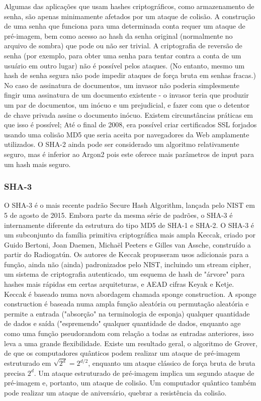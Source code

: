 \documentclass[conference]{IEEEtran}
\begin{document}
Algumas das aplicações que usam hashes criptográficos, como armazenamento de senha, são apenas 
minimamente afetados por um ataque de colisão. A construção de uma senha que funciona para uma 
determinada conta requer um ataque de pré-imagem, bem como acesso ao hash da senha original 
(normalmente no arquivo de sombra) que pode ou não ser trivial. A criptografia de reversão de 
senha (por exemplo, para obter uma senha para tentar contra a conta de um usuário em outro lugar) 
não é possível pelos ataques. (No entanto, mesmo um hash de senha segura não pode impedir ataques de 
força bruta em senhas fracas.)
No caso de assinatura de documentos, um invasor não poderia simplesmente fingir uma assinatura de 
um documento existente - o invasor teria que produzir um par de documentos, um inócuo e um prejudicial, 
e fazer com que o detentor de chave privada assine o documento inócuo. Existem circunstâncias 
práticas em que isso é possível; Até o final de 2008, era possível criar certificados 
SSL forjados usando uma colisão MD5 que seria aceita por navegadores da Web amplamente utilizados.
O SHA-2 ainda pode ser considerado um algoritmo relativamente seguro, mas é inferior ao Argon2 
pois este oferece mais parâmetros de input para um hash mais seguro.

\subsubsection{SHA-3}

O SHA-3 é o mais recente padrão Secure Hash Algorithm, lançada pelo NIST em 5 de agosto de 2015. 
Embora parte da mesma série de padrões, o SHA-3 é internamente diferente da estrutura do 
tipo MD5 de SHA-1 e SHA-2.
O SHA-3 é um subconjunto da família primitiva criptográfica mais ampla Keccak, criado por 
Guido Bertoni, Joan Daemen, Michaël Peeters e Gilles van Assche, construído a partir do Radiogatún. 
Os autores de Keccak propuseram usos adicionais para a função, ainda não (ainda) padronizados pelo 
NIST, incluindo um stream cipher, um sistema de criptografia autenticado, um esquema de hash de 
"árvore" para hashes mais rápidas em certas arquiteturas, e AEAD cifras Keyak e Ketje.
Keccak é baseado numa nova abordagem chamada sponge construction. A sponge construction 
é baseada numa ampla função aleatória ou permutação aleatória e permite a entrada ("absorção" 
na terminologia de esponja) qualquer quantidade de dados e saída ("espremendo" qualquer 
quantidade de dados, enquanto age como uma função pseudorandom com relação a todas as 
entradas anteriores, isso leva a uma grande flexibilidade.
Existe um resultado geral, o algoritmo de Grover, de que os computadores quânticos podem 
realizar um ataque de pré-imagem estruturado em $ \sqrt {2^{d}} = {2^{d/2}}$, enquanto um ataque clássico de 
força bruta de bruta precisa $2^{d}$. Um ataque estruturado de pré-imagem implica um segundo ataque de 
pré-imagem e, portanto, um ataque de colisão. Um computador quântico também pode realizar um 
ataque de aniversário, quebrar a resistência da colisão. \cite{SHA32022}
\end{document}
